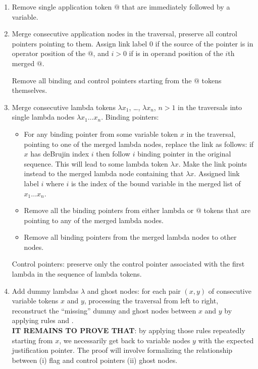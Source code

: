 \documentclass{article}
\theoremstyle{definition}
\newcommand{\normalizing}{{\sf norm}}
\begin{document}
\begin{enumerate}
\item Remove single application token $@$ that are immediately followed by a variable.
\item Merge consecutive application nodes in the traversal, preserve all control pointers pointing to them. Assign link label $0$ if the source of the pointer is in operator position of the $@$, and $i >0$ if is in operand position of the $i$th merged $@$.

Remove all binding and control pointers starting from the $@$ tokens themselves.

\item Merge consecutive lambda tokens $\lambda x_1$, \ldots, $\lambda x_n$, $n>1$ in the traversals into single lambda nodes $\lambda x_1 \ldots x_n$.
 Binding pointers:
 \begin{itemize}
 \item For any binding pointer from some variable token $x$ in the traversal, pointing to one of the merged lambda nodes, replace the link as follows: if $x$ has deBrujin index $i$ then follow $i$ binding pointer in the original sequence. This will lead to some lambda token $\lambda x$. Make the link points instead to the merged lambda node containing that $\lambda x$. Assigned link label $i$ where $i$ is the index of the bound variable in the merged list of $x_1 \ldots x_n$.
 \item Remove all the binding pointers from either lambda or $@$ tokens that are pointing to any of the merged lambda nodes.
 \item Remove all binding pointers from the merged lambda nodes to other nodes.
 \end{itemize}
 Control pointers: preserve only the control pointer associated with the first lambda in the sequence of lambda tokens.

\item Add dummy lambdas $\lambda$ and ghost nodes: for each pair $(x,y)$ of consecutive variable tokens $x$ and $y$, processing the traversal from left to right, reconstruct the ``missing'' dummy and ghost nodes between $x$ and $y$ by applying rules \rulenamet{Lam^\normalizing} and \rulenamet{Var^\normalizing}.
\\

{\bf IT REMAINS TO PROVE THAT}: by applying those rules repeatedly starting from $x$, we necessarily get back to variable nodes $y$ with the expected justification pointer. The proof will involve formalizing the relationship between (i) flag  and control pointers (ii) ghost nodes.
\end{enumerate}
\end{document}
